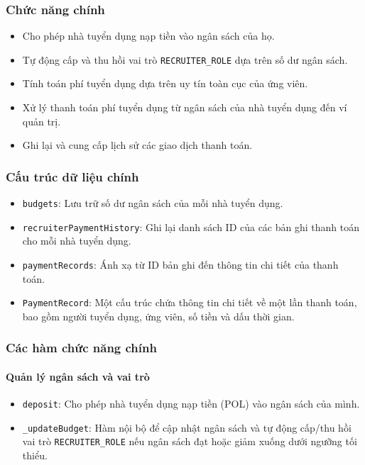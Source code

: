 \subsubsection{Chức năng chính}

\begin{itemize}
  \item Cho phép nhà tuyển dụng nạp tiền vào ngân sách của họ.
  \item Tự động cấp và thu hồi vai trò \texttt{RECRUITER\_ROLE} dựa trên số dư ngân sách.
  \item Tính toán phí tuyển dụng dựa trên uy tín toàn cục của ứng viên.
  \item Xử lý thanh toán phí tuyển dụng từ ngân sách của nhà tuyển dụng đến ví quản trị.
  \item Ghi lại và cung cấp lịch sử các giao dịch thanh toán.
\end{itemize}

\subsubsection{Cấu trúc dữ liệu chính}

\begin{itemize}
  \item \texttt{budgets}: Lưu trữ số dư ngân sách của mỗi nhà tuyển dụng.
  \item \texttt{recruiterPaymentHistory}: Ghi lại danh sách ID của các bản ghi thanh toán cho mỗi nhà tuyển dụng.
  \item \texttt{paymentRecords}: Ánh xạ từ ID bản ghi đến thông tin chi tiết của thanh toán.
  \item \texttt{PaymentRecord}: Một cấu trúc chứa thông tin chi tiết về một lần thanh toán, bao gồm người tuyển dụng, ứng viên, số tiền và dấu thời gian.
\end{itemize}

\subsubsection{Các hàm chức năng chính}

\paragraph{Quản lý ngân sách và vai trò}

\begin{itemize}
  \item \texttt{deposit}: Cho phép nhà tuyển dụng nạp tiền (POL) vào ngân sách của mình.
  \item \texttt{\_updateBudget}: Hàm nội bộ để cập nhật ngân sách và tự động cấp/thu hồi vai trò \texttt{RECRUITER\_ROLE} nếu ngân sách đạt hoặc giảm xuống dưới ngưỡng tối thiểu.
\end{itemize}

